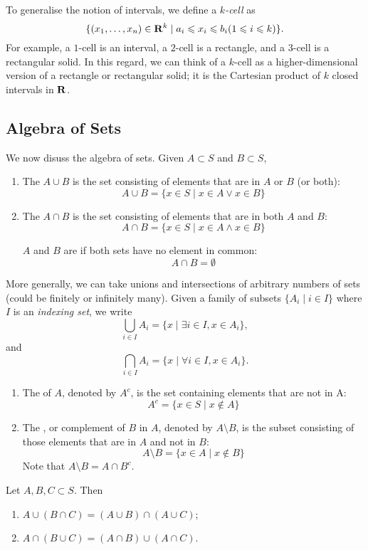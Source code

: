 To generalise the notion of intervals, we define a \emph{$k$-cell} as
\[\{(x_1,\dots,x_n)\in\mathbf R^k\mid a_i\leqslant x_i\leqslant b_i (1\leqslant i\leqslant k)\}.\]
For example, a $1$-cell is an interval, a $2$-cell is a rectangle, and a $3$-cell is a rectangular solid. In this regard, we can think of a $k$-cell as a higher-dimensional version of a rectangle or rectangular solid; it is the Cartesian product of $k$ closed intervals in $\mathbf R$.

\subsection{Algebra of Sets}
We now disuss the algebra of sets. Given $A \subset S$ and $B \subset S$,
\begin{enumerate}[label=(\roman*)]
\item The  $A \cup B$ is the set consisting of elements that are in $A$ or $B$ (or both):
\[ A\cup B=\{x \in S \mid x\in A \lor x\in B\} \]

\item The  $A \cap B$ is the set consisting of elements that are in both $A$ and $B$:
\[ A\cap B=\{x \in S \mid x\in A \land x\in B\} \]

$A$ and $B$ are  if both sets have no element in common:
\[ A\cap B = \emptyset \]
\end{enumerate}

More generally, we can take unions and intersections of arbitrary numbers of sets (could be finitely or infinitely many). Given a family of subsets $\{A_i\mid i\in I\}$ where $I$ is an \emph{indexing set}, we write
\[\bigcup_{i\in I}A_i=\{x \mid \exists i\in I, x\in A_i\},\]
and
\[\bigcap_{i\in I}A_i=\{x \mid \forall i\in I, x\in A_i\}.\]

\begin{enumerate}[resume*]
\item The  of $A$, denoted by $A^c$, is the set containing elements that are not in A:
\[ A^c = \{x \in S \mid x \notin A\} \]

\item The , or complement of $B$ in $A$, denoted by $A\setminus B$, is the subset consisting of those elements that are in $A$ and not in $B$:
\[ A\setminus B = \{x \in A \mid x \notin B\} \]
Note that $A\setminus B = A \cap B^c$.
\end{enumerate}

\begin{proposition}
Let $A,B,C\subset S$. Then
\begin{enumerate}[label=(\roman*)]
\item $A\cup(B\cap C)=(A\cup B)\cap(A\cup C)$;
\item $A\cap(B\cup C)=(A\cap B)\cup(A\cap C)$.
\end{enumerate}
\end{proposition}

